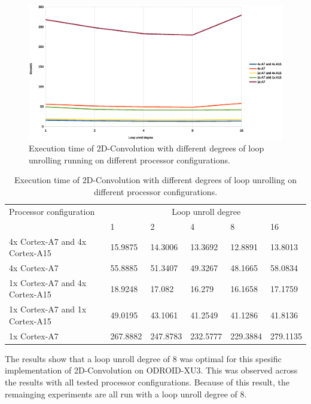\begin{figure}[H]
  \centering
  \includegraphics[width=160mm]{fig/loop-unroll-execution-time.eps}
  \caption{Execution time of 2D-Convolution with different degrees of loop unrolling running on different processor configurations. \label{overflow}}
\end{figure}
\begin{table}[H]
  \begin{tabular}{llllll}
    \toprule
    Processor configuration           & \multicolumn{5}{c}{Loop unroll degree} \\
                                      & 1                   & 2         & 4         & 8         & 16 \\
    \midrule
    4x Cortex-A7 and 4x Cortex-A15    & 15.9875             & 14.3006   & 13.3692   & 12.8891   & 13.8013 \\
    4x Cortex-A7                      & 55.8885             & 51.3407   & 49.3267   & 48.1665   & 58.0834 \\
    1x Cortex-A7 and 4x Cortex-A15    & 18.9248             & 17.082    & 16.279    & 16.1658   & 17.1759 \\
    1x Cortex-A7 and 1x Cortex-A15    & 49.0195             & 43.1061   & 41.2549   & 41.1286   & 41.8136 \\
    1x Cortex-A7                      & 267.8882            & 247.8783  & 232.5777  & 229.3884  & 279.1135 \\
    \bottomrule
  \end{tabular}
  \caption{Execution time of 2D-Convolution with different degrees of loop unrolling on different processor configurations. \label{overflow}}
\end{table}

The results show that a loop unroll degree of 8 was optimal for this spesific implementation of 2D-Convolution on ODROID-XU3.
This was observed across the results with all tested processor configurations.
Because of this result, the remainging experiments are all run with a loop unroll degree of 8.

